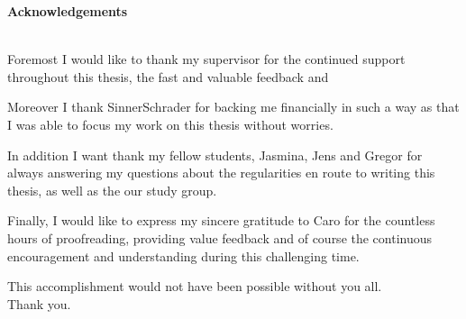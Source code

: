 \thispagestyle{empty}\thispagestyle{noheader}

\begin{large}
	\textbf{Acknowledgements} \\ \\
\end{large}

Foremost I would like to thank my supervisor \firstTutor for the continued support throughout this thesis, the fast and valuable feedback and 

Moreover I thank SinnerSchrader for backing me financially in such a way as that I was able to focus my work on this thesis without worries.

In addition I want thank my fellow students, Jasmina, Jens and Gregor for always answering my questions about the regularities en route to writing this thesis, as well as the our study group.

Finally, I would like to express my sincere gratitude to Caro for the countless hours of proofreading, providing value feedback and of course the continuous encouragement and understanding during this challenging time.

This accomplishment would not have been possible without you all.\\
Thank you.

\newpage
